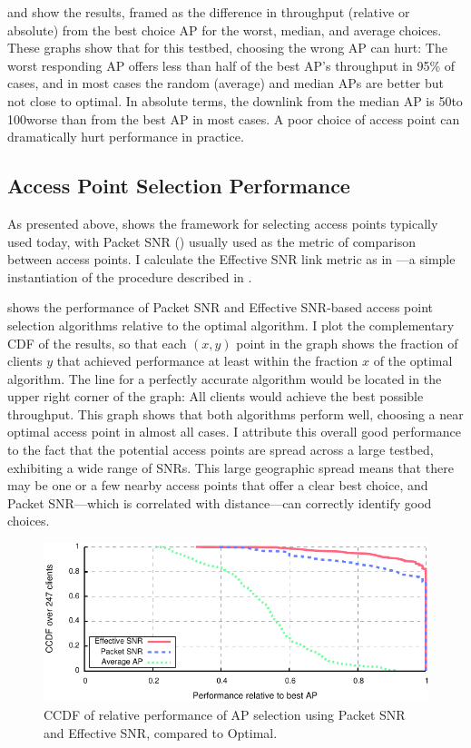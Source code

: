  and  show the results, framed as the difference in throughput (relative or absolute) from the best choice AP for the worst, median, and average choices. These graphs show that for this testbed, choosing the wrong AP can hurt: The worst responding AP offers less than half of the best AP's throughput in 95\% of cases, and in most cases the random (average) and median APs are better but not close to optimal. In absolute terms, the downlink from the median AP is 50\Mbps to 100\Mbps worse than from the best AP in most cases. A poor choice of access point can dramatically hurt performance in practice.

\subsection{Access Point Selection Performance}
As presented above,  shows the framework for selecting access points typically used today, with Packet SNR () usually used as the metric of comparison between access points. I calculate the Effective SNR link metric as in ---a simple instantiation of the procedure described in . 

 shows the performance of Packet SNR and Effective SNR-based access point selection algorithms relative to the optimal algorithm. I plot the complementary CDF of the results, so that each $(x,y)$ point in the graph shows the fraction of clients $y$ that achieved performance at least within the fraction $x$ of the optimal algorithm. The line for a perfectly accurate algorithm would be located in the upper right corner of the graph: All clients would achieve the best possible throughput.  This graph shows that both algorithms perform well, choosing a near optimal access point in almost all cases. I attribute this overall good performance to the fact that the potential access points are spread across a large testbed, exhibiting a wide range of SNRs. This large geographic spread means that there may be one or a few nearby access points that offer a clear best choice, and Packet SNR---which is correlated with distance---can correctly identify good choices.

\begin{figure}[t]
	\centering
	\includegraphics[width=\textwidth]{figures/applications/ap_sel_ratio_opt.pdf}
	\caption[AP selection using Packet SNR or Effective SNR compared to Optimal]{\label{fig:ap_sel_ratio_opt}CCDF of relative performance of AP selection using Packet SNR and Effective SNR, compared to Optimal.}
\end{figure}

